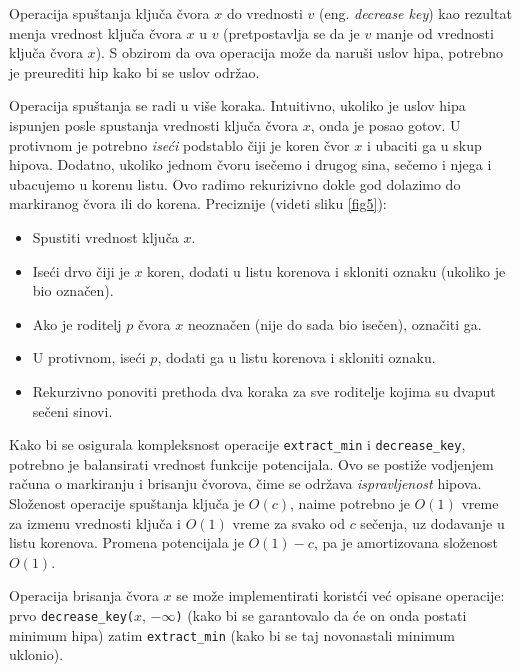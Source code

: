 \documentclass[a4paper]{article}
\theoremstyle{plain}
\theoremstyle{definition}
\begin{document}
Operacija spu\v{s}tanja klju\v{c}a \v{c}vora $x$ do vrednosti $v$ (eng. \emph{decrease key}) kao rezultat menja vrednost klju\v{c}a \v{c}vora $x$ u $v$ (pretpostavlja se da je $v$  manje od vrednosti klju\v{c}a \v{c}vora $x$). S obzirom da ova operacija mo\v{z}e da naru\v{s}i uslov hipa, potrebno je preurediti hip kako bi se uslov odr\v{zao}.

Operacija spu\v{s}tanja se radi u vi\v{s}e koraka. Intuitivno, ukoliko je uslov hipa ispunjen posle spu{s}tanja vrednosti klju\v{c}a \v{c}vora $x$, onda je posao gotov. U protivnom je potrebno \emph{ise\'c{}i} podstablo \v{c}iji je koren \v{c}vor $x$ i ubaciti ga u skup hipova. Dodatno, ukoliko jednom \v{c}voru ise\v{c}emo i drugog sina, se\v{c}emo i njega i ubacujemo u korenu listu. Ovo radimo rekurizivno dokle god dolazimo do markiranog \v{c}vora ili do korena. Preciznije (videti sliku \ref{fig5}):
\begin{itemize}
    \item Spustiti vrednost klju\v{c}a $x$.
    \item Ise\'c{}i drvo \v{c}iji je $x$ koren, dodati u listu korenova i skloniti oznaku (ukoliko je bio ozna\v{c}en).
    \item Ako je roditelj $p$ \v{c}vora $x$ neozna\v{c}en (nije do sada bio ise\v{c}en), ozna\v{c}iti ga.
    \item U protivnom, ise\'{c}i $p$, dodati ga u listu korenova i skloniti oznaku.
    \item Rekurzivno ponoviti prethoda dva koraka za sve roditelje kojima su dvaput se\v{c}eni sinovi. 
\end{itemize}

Kako bi se osigurala kompleksnost operacije \texttt{extract\_min} i \texttt{decrease\_key}, potrebno je balansirati vrednost funkcije potencijala. Ovo se posti\v{z}e vodjenjem ra\v{c}una o markiranju i brisanju \v{c}vorova, \v{c}ime se odr\v{z}ava \emph{ispravljenost} hipova.
Slo\v{z}enost operacije spu\v{s}tanja klju\v{c}a je $O(c)$, naime potrebno je $O(1)$ vreme za izmenu vrednosti klju\v{c}a i $O(1)$ vreme za svako od $c$ se\v{c}enja, uz dodavanje u listu korenova. Promena potencijala je $O(1) - c$, pa je amortizovana slo\v{z}enost $O(1)$.

Operacija brisanja \v{c}vora $x$ se mo\v{z}e implementirati korist\'c{}i ve\'c{} opisane operacije: prvo \texttt{decrease\_key(}$x$, $-\infty$\texttt{)}  (kako bi se garantovalo da \'c{}e on onda postati minimum hipa) zatim \texttt{extract\_min} (kako bi se taj novonastali minimum uklonio).
\end{document}
